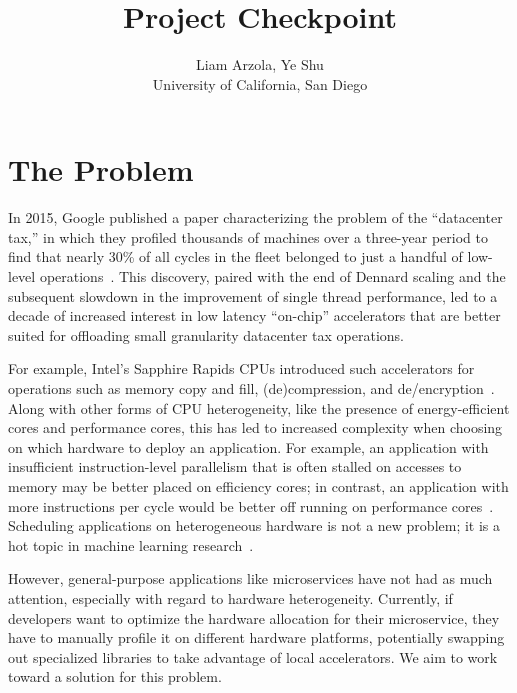 \documentclass[letterpaper,twocolumn,10pt]{article}
\begin{document}
\date{}
\title{Project Checkpoint}

\author{
{\rm Liam Arzola, Ye Shu}\\
University of California, San Diego
}

\maketitle

\section{The Problem}
In 2015, Google published a paper characterizing the problem of the ``datacenter tax,'' in which they profiled thousands of machines over a three-year period to find that nearly 30\% of all cycles in the fleet belonged to just a handful of low-level operations~\cite{kanev2015profiling}. 
This discovery, paired with the end of Dennard scaling and the subsequent slowdown in the improvement of single thread performance, led to a decade of increased interest in low latency ``on-chip'' accelerators that are better suited for offloading small granularity datacenter tax operations. 

For example, Intel's Sapphire Rapids CPUs introduced such accelerators for operations such as memory copy and fill, (de)compression, and de/encryption~\cite{yuan2024intel}. 
Along with other forms of CPU heterogeneity, like the presence of energy-efficient cores and performance cores, this has led to increased complexity when choosing on which hardware to deploy an application. 
For example, an application with insufficient instruction-level parallelism that is often stalled on accesses to memory may be better placed on efficiency cores; in contrast, an application with more instructions per cycle would be better off running on performance cores~\cite{kanev2015profiling}. 
Scheduling applications on heterogeneous hardware is not a new problem; it is a hot topic in machine learning research~\cite{narayanan2023hetero,subramanya2023sia}. 

However, general-purpose applications like microservices have not had as much attention, especially with regard to hardware heterogeneity. 
Currently, if developers want to optimize the hardware allocation for their microservice, they have to manually profile it on different hardware platforms, potentially swapping out specialized libraries to take advantage of local accelerators. 
We aim to work toward a solution for this problem.
\end{document}
